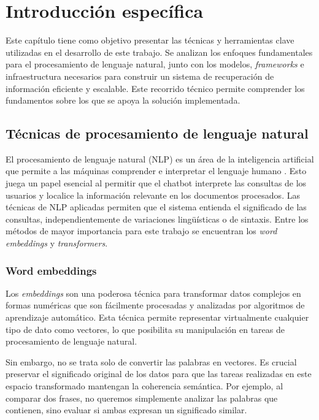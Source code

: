\chapter{Introducción específica} %

\label{Chapter2}


Este capítulo tiene como objetivo presentar las técnicas y herramientas clave utilizadas en el 
desarrollo de este trabajo. Se analizan los enfoques fundamentales para el procesamiento de 
lenguaje natural, junto con los modelos, \textit{frameworks} e infraestructura necesarios para 
construir un sistema de recuperación de información eficiente y escalable. Este recorrido 
técnico permite comprender los fundamentos sobre los que se apoya la solución implementada. 

\section{Técnicas de procesamiento de lenguaje natural}

El procesamiento de lenguaje natural (NLP) es un área de la inteligencia artificial que permite 
a las máquinas comprender e interpretar el lenguaje humano \citep{book:nlp}. Esto juega un papel esencial 
al permitir que el chatbot interprete las consultas de los usuarios y localice la información relevante en los 
documentos procesados. Las técnicas de NLP aplicadas permiten que el sistema entienda el 
significado de las consultas, independientemente de variaciones lingüísticas o de sintaxis. Entre los 
métodos de mayor importancia para este trabajo se encuentran los \textit{word embeddings} y
\textit{transformers}.

\subsection{Word embeddings}

Los \textit{embeddings} son una poderosa técnica para transformar datos complejos en formas numéricas que 
son fácilmente procesadas y analizadas por algoritmos de aprendizaje automático. Esta técnica permite 
representar virtualmente cualquier tipo de dato como vectores, lo que posibilita su manipulación en tareas de 
procesamiento de lenguaje natural.

Sin embargo, no se trata solo de convertir las palabras en vectores. Es crucial preservar el significado original 
de los datos para que las tareas realizadas en este espacio transformado mantengan la coherencia semántica. 
Por ejemplo, al comparar dos frases, no queremos simplemente analizar las palabras que contienen, sino evaluar 
si ambas expresan un significado similar.

